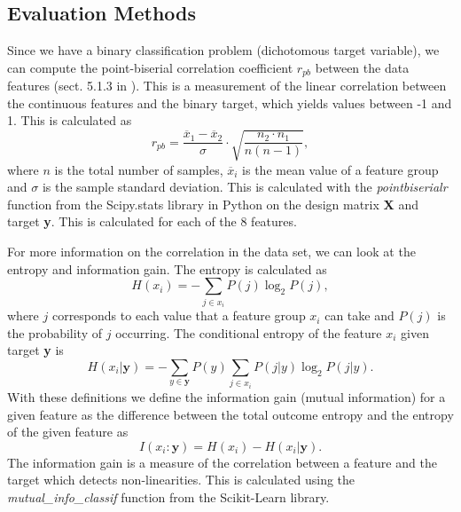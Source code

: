 \documentclass[12pt,a4paper,english]{article}
\begin{document}
\subsection{Evaluation Methods}
\label{subsect:eval_methods}
Since we have a binary classification problem (dichotomous target variable), we can compute the point-biserial correlation coefficient $r_{pb}$ between the data features (sect. 5.1.3 in \citet{pulsar_art}). This is a measurement of the linear correlation between the continuous features and the binary target, which yields values between -1 and 1. This is calculated as 
\begin{equation}
\label{eq:point_biserial}
r_{pb}=\frac{\overline{x}_1-\overline{x}_2}{\sigma}\cdot\sqrt{\frac{n_2\cdot n_1}{n(n-1)}},
\end{equation}
where $n$ is the total number of samples, $\overline{x}_i$ is the mean value of a feature group and $\sigma$ is the sample standard deviation. This is calculated with the \textit{pointbiserialr} function from the Scipy.stats library in Python on the design matrix \textbf{X} and target \textbf{y}. This is calculated for each of the 8 features.

For more information on the correlation in the data set, we can look at the entropy and information gain. The entropy is calculated as
\begin{equation*}
H(x_i)=-\sum_{j\in x_i}P(j)\log_2P(j),
\end{equation*}
where $j$ corresponds to each value that a feature group $x_i$ can take and $P(j)$ is the probability of $j$ occurring. The conditional entropy of the feature $x_i$ given target \textbf{y} is 
\begin{equation*}
H(x_i|\textbf{y})=-\sum_{y\in\textbf{y}}P(y)\sum_{j\in x_i}P(j|y)\log_2P(j|y).
\end{equation*} 
With these definitions we define the information gain (mutual information) for a given feature as the difference between the total outcome entropy and the entropy of the given feature as
\begin{equation}
\label{eq:inf_gain}
I(x_i:\textbf{y})=H(x_i)-H(x_i|\textbf{y}).
\end{equation}
The information gain is a measure of the correlation between a feature and the target which detects non-linearities. This is calculated using the \textit{mutual\_info\_classif} function from the Scikit-Learn library.
\end{document}

